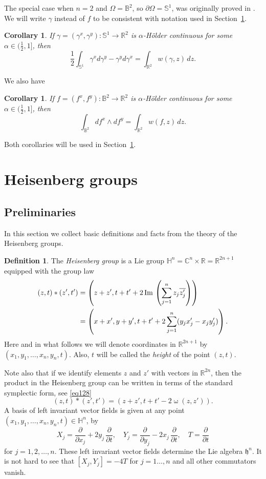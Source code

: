 \documentclass[intlimits,12pt,reqno]{amsart}
\newcommand{\bbbr}{\mathbb R}
\newcommand{\bbbc}{\mathbb C}
\newcommand{\bbbb}{\mathbb B}
\newcommand{\bbbs}{\mathbb S}
\newcommand{\bbbh}{\mathbb H}
\newcommand{\R}{\mathbb R}
\numberwithin{equation}{section}
\newtheorem{corollary}[theorem]{Corollary}
\theoremstyle{definition}
\newtheorem{definition}[theorem]{Definition}
\begin{document}
The special case when $n=2$ and $\Omega=\bbbb^2$, so $\partial\Omega=\bbbs^1$, was originally proved in \cite[Lemma~2.3]{LZ}.
We will write $\gamma$ instead of $f$ to be consistent with notation used in Section~\ref{S7}.
\begin{corollary}
\label{T91}
If $\gamma=(\gamma^x,\gamma^y):\mathbb{S}^1\to\mathbb{R}^2$ is $\alpha$-H\"older continuous for some $\alpha\in (\frac{1}{2},1]$, then
\begin{equation}
\label{eq187}
\frac{1}{2}\int_{\mathbb{S}^1}\gamma^x d\gamma^y-\gamma^y d\gamma^x=\int_{\mathbb{R}^2}w(\gamma,z)\, dz.
\end{equation}
\end{corollary}
We also have
\begin{corollary}
\label{T94}
If $f=(f^x,f^y):\bbbb^2\to\R^2$ is $\alpha$-H\"older continuous for some $\alpha\in (\frac{1}{2},1]$, then
$$
\int_{\bbbb^2} df^x\wedge df^y=\int_{\R^2} w(f,z)\, dz.
$$
\end{corollary}
Both corollaries will be used in Section~\ref{S7}.



\section{Heisenberg groups}
\label{S7}
\subsection{Preliminaries}
In this section we collect basic definitions and facts from the theory of the Heisenberg groups.

\begin{definition}
The {\em Heisenberg group}  is a Lie group
$\bbbh^n=\bbbc^n\times\bbbr=\bbbr^{2n+1}$ equipped with the group law
\begin{align*}
(z,t)*(z',t')
&=
\left(z+z',t+t'+2\, {\rm Im}\,  \left(\sum_{j=1}^n z_j
\overline{z_j'}\right)\right)\\
&=
\left(x+x',y+y',t+t'+2\sum_{j=1}^n(y_jx_j'-x_jy_j')\right).
\end{align*}
Here and in what follows we will denote coordinates in $\R^{2n+1}$ by
$(x_1,y_1,\ldots,x_n,y_n,t)$.
Also, $t$ will be called the \emph{height} of the point $(z,t)$.
\end{definition}



Note also that if we identify elements $z$ and $z'$ with vectors in $\bbbr^{2n}$, then the
product in the Heisenberg group can be written in terms of the standard symplectic form, see \eqref{eq128}
$$
(z,t)*(z',t')=(z+z',t+t'-2\upomega(z,z')).
$$
A basis of left invariant vector fields is given 
at any point $(x_1,y_1,\dots,x_n,y_n,t) \in \bbbh^n$, by
$$
X_j=\frac{\partial}{\partial x_j}+ 2y_j\, \frac{\partial}{\partial t},
\quad
Y_j=\frac{\partial}{\partial y_j}- 2x_j\, \frac{\partial}{\partial t},
\quad
T=\frac{\partial}{\partial t}
$$
for $j=1,2,\dots,n$.
These left invariant vector fields determine the Lie algebra $\mathfrak{h}^n$. 
It is not hard to see that
$[X_j,Y_j]=-4T$ for $j=1\dots,n$
and all other commutators vanish.
\end{document}

